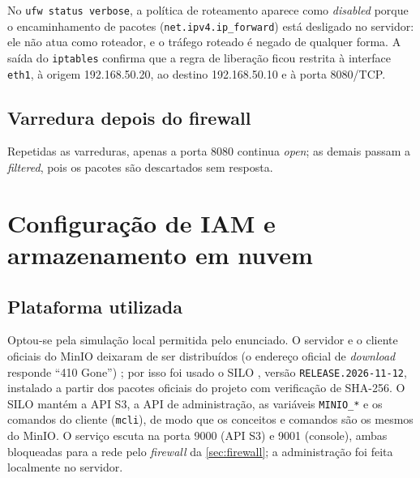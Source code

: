 

No \texttt{ufw status verbose}, a política de roteamento aparece como \emph{disabled}
porque o encaminhamento de pacotes (\texttt{net.ipv4.ip\_forward}) está desligado no
servidor: ele não atua como roteador, e o tráfego roteado é negado de qualquer forma.
A saída do \texttt{iptables} confirma que a regra de liberação ficou restrita à interface
\texttt{eth1}, à origem 192.168.50.20, ao destino 192.168.50.10 e à porta 8080/TCP.

\subsection{Varredura depois do firewall}

Repetidas as varreduras, apenas a porta 8080 continua \emph{open}; as demais passam a
\emph{filtered}, pois os pacotes são descartados sem resposta.



\section{Configuração de IAM e armazenamento em nuvem}\label{sec:iam}

\subsection{Plataforma utilizada}

Optou-se pela simulação local permitida pelo enunciado. O servidor e o cliente oficiais
do MinIO deixaram de ser distribuídos (o endereço oficial de \textit{download} responde
``410 Gone'') \cite{minio-arquivado}; por isso foi usado o SILO \cite{silo-docs}, versão
\texttt{RELEASE.2026-11-12}, instalado a partir dos pacotes oficiais do projeto com
verificação de SHA-256. O SILO mantém a API S3, a API de administração, as variáveis
\texttt{MINIO\_*} e os comandos do cliente (\texttt{mcli}), de modo que os conceitos e
comandos são os mesmos do MinIO. O serviço escuta na porta 9000 (API S3) e 9001 (console),
ambas bloqueadas para a rede pelo \textit{firewall} da \autoref{sec:firewall}; a
administração foi feita localmente no servidor.

